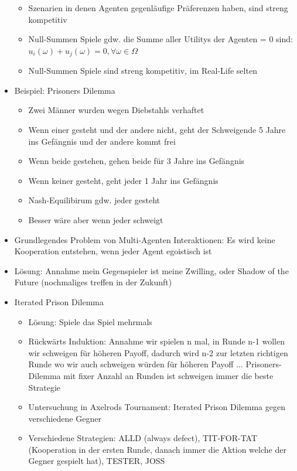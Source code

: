 \documentclass{article} %
\begin{document}
\begin{itemize}
\begin{itemize}
			\item Szenarien in denen Agenten gegenläufige Präferenzen haben, sind streng kompetitiv
			\item Null-Summen Spiele gdw. die Summe aller Utilitys der Agenten = 0 sind: $u_i(\omega) + u_j(\omega) = 0, \forall \omega \in \Omega$
			\item Null-Summen Spiele sind streng kompetitiv, im Real-Life selten
		\end{itemize}
		\item Beispiel: Prisoners Dilemma
		\begin{itemize}
			\item Zwei Männer wurden wegen Diebstahls verhaftet 
			\item Wenn einer gesteht und der andere nicht, geht der Schweigende 5 Jahre ins Gefängnis und der andere kommt frei
			\item Wenn beide gestehen, gehen beide für 3 Jahre ins Gefängnis
			\item Wenn keiner gesteht, geht jeder 1 Jahr ins Gefängnis
			\item Nash-Equilibirum gdw. jeder gesteht
			\item Besser wäre aber wenn jeder schweigt
		\end{itemize}
		\item Grundlegendes Problem von Multi-Agenten Interaktionen: Es wird keine Kooperation entstehen, wenn jeder Agent egoistisch ist
		\item Lösung: Annahme mein Gegenspieler ist meine Zwilling, oder Shadow of the Future (nochmaliges treffen in der Zukunft)
		\item Iterated Prison Dilemma
		\begin{itemize}
			\item Lösung: Spiele das Spiel mehrmals
			\item Rückwärts Induktion: Annahme wir spielen n mal, in Runde n-1 wollen wir schweigen für höheren Payoff, dadurch wird n-2 zur letzten richtigen Runde wo wir auch schweigen würden für höheren Payoff $\dots$ Prisoners-Dilemma mit fixer Anzahl an Runden ist schweigen immer die beste Strategie
			\item Untersuchung in Axelrods Tournament: Iterated Prison Dilemma gegen verschiedene Gegner
			\item Verschiedene Strategien: ALLD (always defect), TIT-FOR-TAT (Kooperation in der ersten Runde, danach immer die Aktion welche der Gegner gespielt hat), TESTER, JOSS
		\end{itemize}
	\end{itemize}
\end{document}
